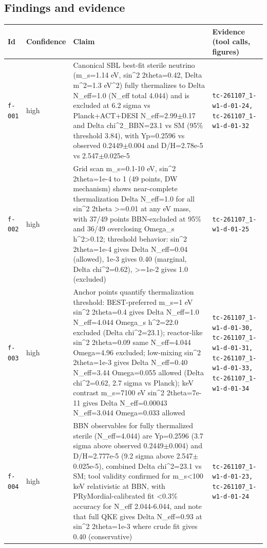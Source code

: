 \documentclass[11pt,a4paper]{article}
\begin{document}
\subsection{Findings and evidence}
\begin{longtable}{@{}p{}p{}p{}p{}@{}}
\toprule Id & Confidence & Claim & Evidence (tool calls, figures) \\ \midrule \endhead
\texttt{f-001} & high & Canonical SBL best-fit sterile neutrino (m\_s=1.14 eV, sin\textasciicircum{}2 2theta=0.42, Delta m\textasciicircum{}2=1.3 eV\textasciicircum{}2) fully thermalizes to Delta N\_eff=1.0 (N\_eff total 4.044) and is excluded at 6.2 sigma vs Planck+ACT+DESI N\_eff=2.99$\pm$0.17 and Delta chi\textasciicircum{}2\_BBN=23.1 vs SM (95\% threshold 3.84), with Yp=0.2596 vs observed 0.2449$\pm$0.004 and D/H=2.78e-5 vs 2.547$\pm$0.025e-5 & \texttt{tc-261107\_\allowbreak{}1-w1-d-01-24,\allowbreak{} tc-261107\_\allowbreak{}1-w1-d-01-32} \\
\texttt{f-002} & high & Grid scan m\_s=0.1-10 eV, sin\textasciicircum{}2 2theta=1e-4 to 1 (49 points, DW mechanism) shows near-complete thermalization Delta N\_eff=1.0 for all sin\textasciicircum{}2 2theta \textgreater{}=0.01 at any eV mass, with 37/49 points BBN-excluded at 95\% and 36/49 overclosing Omega\_s h\textasciicircum{}2\textgreater{}0.12; threshold behavior: sin\textasciicircum{}2 2theta=1e-4 gives Delta N\_eff=0.04 (allowed), 1e-3 gives 0.40 (marginal, Delta chi\textasciicircum{}2=0.62), \textgreater{}=1e-2 gives 1.0 (excluded) & \texttt{tc-261107\_\allowbreak{}1-w1-d-01-25} \\
\texttt{f-003} & high & Anchor points quantify thermalization threshold: BEST-preferred m\_s=1 eV sin\textasciicircum{}2 2theta=0.4 gives Delta N\_eff=1.0 N\_eff=4.044 Omega\_s h\textasciicircum{}2=22.0 excluded (Delta chi\textasciicircum{}2=23.1); reactor-like sin\textasciicircum{}2 2theta=0.09 same N\_eff=4.044 Omega=4.96 excluded; low-mixing sin\textasciicircum{}2 2theta=1e-3 gives Delta N\_eff=0.40 N\_eff=3.44 Omega=0.055 allowed (Delta chi\textasciicircum{}2=0.62, 2.7 sigma vs Planck); keV contrast m\_s=7100 eV sin\textasciicircum{}2 2theta=7e-11 gives Delta N\_eff=0.00043 N\_eff=3.044 Omega=0.033 allowed & \texttt{tc-261107\_\allowbreak{}1-w1-d-01-30,\allowbreak{} tc-261107\_\allowbreak{}1-w1-d-01-31,\allowbreak{} tc-261107\_\allowbreak{}1-w1-d-01-33,\allowbreak{} tc-261107\_\allowbreak{}1-w1-d-01-34} \\
\texttt{f-004} & high & BBN observables for fully thermalized sterile (N\_eff=4.044) are Yp=0.2596 (3.7 sigma above observed 0.2449$\pm$0.004) and D/H=2.777e-5 (9.2 sigma above 2.547$\pm$0.025e-5), combined Delta chi\textasciicircum{}2=23.1 vs SM; tool validity confirmed for m\_s\textless{}100 keV relativistic at BBN, with PRyMordial-calibrated fit \textless{}0.3\% accuracy for N\_eff 2.044-6.044, and note that full QKE gives Delta N\_eff=0.93 at sin\textasciicircum{}2 2theta=1e-3 where crude fit gives 0.40 (conservative) & \texttt{tc-261107\_\allowbreak{}1-w1-d-01-23,\allowbreak{} tc-261107\_\allowbreak{}1-w1-d-01-24} \\

\end{longtable}
\end{document}
